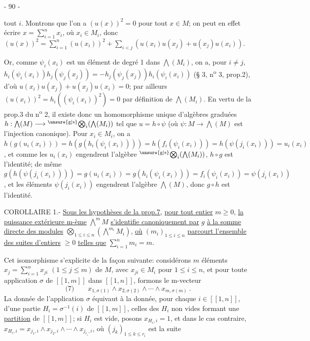 \begin{center}- 90 -\end{center}

tout $i$. Montrons que l'on a $(u(x))^2=0$ pour tout $x\in M$; on peut en effet écrire $x=\sum_{i=1}^n x_i$, où $x_i\in M_i$, donc $(u(x))^2=\sum_{i=1}^n(u(x_i))^2+\sum_{i<j}(u(x_i)u(x_j)+u(x_j)u(x_i))$.

Or, comme $\psi_i(x_i)$ est un élément de degré 1 dans $\bigwedge(M_i)$, on a, pour $i\ne j$, $h_i(\psi_i(x_i))h_j(\psi_j(x_j))=-h_j(\psi_j(x_j))h_i(\psi_i(x_i))$ (§ 3, n\textsuperscript{o} 3, prop.2), d'où $u(x_i)u(x_j)+u(x_j)u(x_i)=0$; par ailleurs $(u(x_i))^2=h_i((\psi_i(x_i))^2)=0$ par définition de $\bigwedge(M_i)$. En vertu de la prop.3 du n\textsuperscript{o} 2, il existe donc un homomorphisme unique d'algèbres graduées $h:\bigwedge(M)\longrightarrow{}^{\unsure{\mathrm g|\mathrm s}}\!\bigotimes_i(\bigwedge(M_i))$ tel que $u=h\circ\psi$ (où $\psi:M\longrightarrow\bigwedge(M)$ est l'injection canonique). Pour $x_i\in M_i$, on a $h(g(u_i(x_i)))=h(g(h_i(\psi_i(x_i))))=h(f_i(\psi_i(x_i)))=h(\psi(j_i(x_i)))=u_i(x_i)$, et comme les $u_i(x_i)$ engendrent l'algèbre ${}^{\unsure{\mathrm g|\mathrm s}}\!\bigotimes_i(\bigwedge(M_i))$, $h\circ g$ est l'identité; de même $g(h(\psi(j_i(x_i))))=g(u_i(x_i))=g(h_i(\psi_i(x_i)))=f_i(\psi_i(x_i))=\psi(j_i(x_i))$, et les éléments $\psi(j_i(x_i))$ engendrent l'algèbre $\bigwedge(M)$, donc $g\circ h$ est l'identité.

COROLLAIRE 1.- \uline{Sous les hypothèses de la prop.7}, \uline{pour tout entier} $m\geq0$, \uline{la puissance extérieure m-ème} $\mathop{\bigwedge}\limits^m M$ \uline{s'identifie canoniquement par} $g$ \uline{à la somme directe des modules} $\bigotimes_{1\leq i\leq n}(\mathop{\bigwedge}\limits^{m_i}M_i)$, \uline{où} $(m_i)_{1\leq i\leq n}$ \uline{parcourt l'ensemble des suites d'entiers} $\geq0$ \uline{telles que} $\sum_{i=1}^n m_i=m$.

Cet isomorphisme s'explicite de la façon suivante: considérons $m$ éléments $x_j=\sum_{i=1}^n x_{ji}$ $(1\leq j\leq m)$ de $M$, avec $x_{ji}\in M_i$ pour $1\leq i\leq n$, et pour toute application $\sigma$ de $[\![1,m]\!]$ dans $[\![1,n]\!]$, formons le m-vecteur
\[
\text{(7)}\qquad x_{1,\sigma(1)}\wedge x_{2,\sigma(2)}\wedge\cdots\wedge x_{m,\sigma(m)}\ .
\]
La donnée de l'application $\sigma$ équivaut à la donnée, pour chaque $i\in[\![1,n]\!]$, d'une partie $H_i=\sigma^{-1}(i)$ de $[\![1,m]\!]$, celles des $H_i$ non vides formant une \uline{partition} de $[\![1,m]\!]$; si $H_i$ est vide, posons $x_{H_i,i}=1$, et dans le cas contraire, $x_{H_i,i}=x_{j_1,i}\wedge x_{j_2,i}\wedge\cdots\wedge x_{j_{r_i},i}$, où $(j_k)_{1\leq k\leq r_i}$ est la suite
